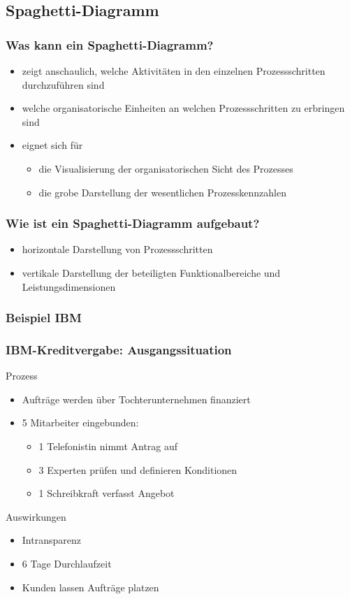 \documentclass[xcolor=dvipsnames]{beamer}
\begin{document}
 \subsection[Spaghetti-Diagramm]{Spaghetti-Diagramm}
 \begin{frame}
  \frametitle{Was kann ein Spaghetti-Diagramm?  }

  \begin{itemize}
  \item zeigt anschaulich, welche Aktivitäten in den einzelnen Prozessschritten durchzuführen sind
  \item welche organisatorische Einheiten an welchen Prozessschritten zu erbringen sind
  \item eignet sich für
  \begin{itemize}
    \item die Visualisierung der organisatorischen Sicht des Prozesses
    \item die grobe Darstellung der wesentlichen Prozesskennzahlen
  \end{itemize}
  \end{itemize}

   \end{frame}

\begin{frame}
  \frametitle{Wie ist ein Spaghetti-Diagramm aufgebaut?}

  \begin{itemize}
  \item horizontale Darstellung von Prozessschritten
  \item vertikale Darstellung der beteiligten Funktionalbereiche und Leistungsdimensionen
  \end{itemize}

 \end{frame}


 \subsubsection[Beispiel IBM]{Beispiel IBM}
 \begin{frame}
  \frametitle{IBM-Kreditvergabe: Ausgangssituation}
  Prozess
  \begin{itemize}
    \item Aufträge werden über Tochterunternehmen finanziert
    \item 5 Mitarbeiter eingebunden:
    \begin{itemize}
      \item 1 Telefonistin nimmt Antrag auf
      \item 3 Experten prüfen und definieren Konditionen
      \item 1 Schreibkraft verfasst Angebot
    \end{itemize}
  \end{itemize}
  Auswirkungen
  \begin{itemize}
    \item Intransparenz
    \item 6 Tage Durchlaufzeit
    \item Kunden lassen Aufträge platzen
  \end{itemize}
 \end{frame}
\end{document}
